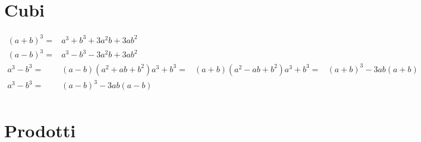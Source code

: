 \section{Cubi}
\begin{align*}
(a+b)^3=&a^3+b^3+3a^2b+3ab^2\\
(a-b)^3=&a^3-b^3-3a^2b+3ab^2\\
a^3-b^3=&(a-b)(a^2+ab+b^2)
a^3+b^3=&(a+b)(a^2-ab+b^2)
a^3+b^3=&(a+b)^3-3ab(a+b)\\
a^3-b^3=&(a-b)^3-3ab(a-b)\\
\end{align*}
\section{Prodotti}

